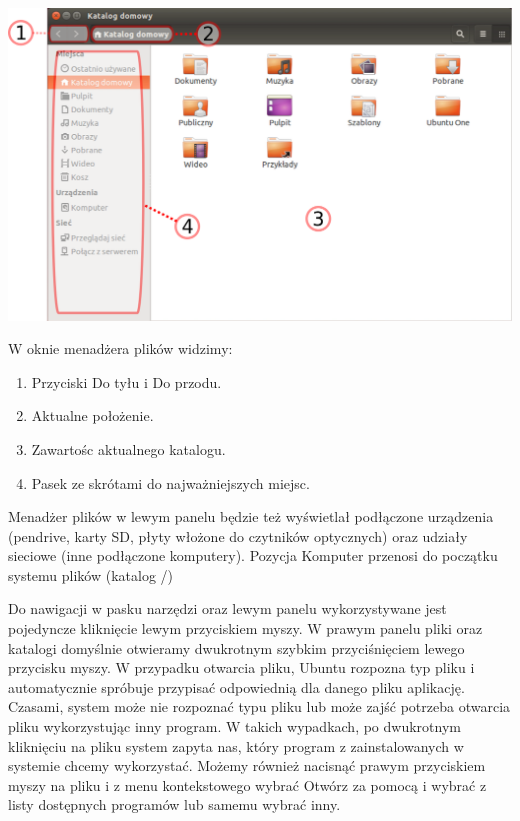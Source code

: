 \begin{center}
	\includegraphics[width=\linewidth]{images/programy_nautilus.png}
\end{center}

W oknie menadżera plików widzimy:
\begin{enumerate}[label=\protect\circled{\arabic*}]
\item Przyciski \textcolor{ubuntu_orange}{Do tyłu} i \textcolor{ubuntu_orange}{Do przodu}.
\item Aktualne położenie.
\item Zawartośc aktualnego katalogu.
\item Pasek ze skrótami do najważniejszych miejsc.
\end{enumerate}

Menadżer plików w lewym panelu będzie też wyświetlał podłączone urządzenia (pendrive, karty SD, płyty włożone do czytników optycznych) oraz udziały sieciowe (inne podłączone komputery). Pozycja \textcolor{ubuntu_orange}{Komputer} przenosi do początku systemu plików (katalog /)

Do nawigacji w pasku narzędzi oraz lewym panelu wykorzystywane jest pojedyncze kliknięcie lewym przyciskiem myszy. W prawym panelu pliki oraz katalogi domyślnie otwieramy dwukrotnym szybkim przyciśnięciem lewego przycisku myszy. W przypadku otwarcia pliku, Ubuntu rozpozna typ pliku i automatycznie spróbuje przypisać odpowiednią dla danego pliku aplikację. Czasami, system może nie rozpoznać typu pliku lub może zajść potrzeba otwarcia pliku wykorzystując inny program. W takich wypadkach, po dwukrotnym kliknięciu na pliku system zapyta nas, który program z zainstalowanych w systemie chcemy wykorzystać. Możemy również nacisnąć prawym przyciskiem myszy na pliku i z menu kontekstowego wybrać Otwórz za pomocą i wybrać z listy dostępnych programów lub samemu wybrać inny.

